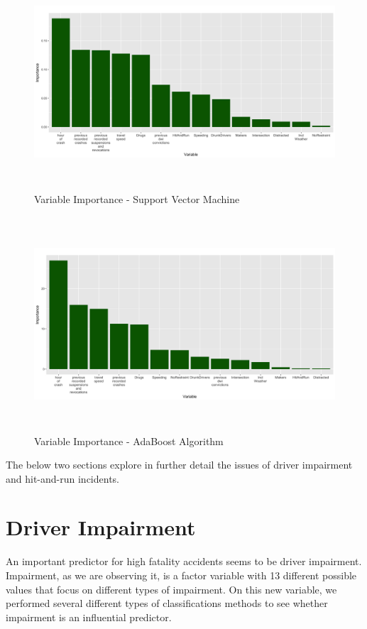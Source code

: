 \documentclass[11pt, oneside,titlepage]{article}   	%
\begin{document}
\begin{figure}[H]
\centering
  \includegraphics[width=15cm,height=8cm,keepaspectratio]{ImportancePlot_SVM.png}
\caption{Variable Importance - Support Vector Machine}
\end{figure}

\begin{figure}[H]
\centering
  \includegraphics[width=15cm,height=8cm,keepaspectratio]{ImportancePlot_ADABoost.png}
\caption{Variable Importance - AdaBoost Algorithm}
\end{figure}

The below two sections explore in further detail the issues of driver impairment and hit-and-run incidents.

\section*{Driver Impairment}

An important predictor for high fatality accidents seems to be driver impairment. Impairment, as we are observing it, is a factor variable with 13 different possible values that focus on different types of impairment. On this new variable, we performed several different types of classifications methods to see whether impairment is an influential predictor.
\end{document}
